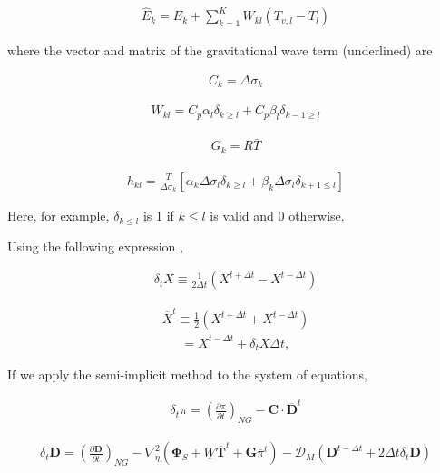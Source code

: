 \begin{eqnarray}
  \hat{E}_k = E_{k} 
            + \sum_{k=1}^{K} W_{kl} ( T_{v,l}-T_{l} )
\end{eqnarray}

where the vector and matrix of the gravitational wave term (underlined)
are

\begin{eqnarray}
  C_{k} = \Delta \sigma_{k}
\end{eqnarray}

\begin{eqnarray}
  W_{kl} = C_{p} \alpha_{l} \delta_{k \geq l}
         + C_{p} \beta_{l} \delta_{k-1 \geq l}
\end{eqnarray}

\begin{eqnarray}
  G_{k} = R\bar{T}
\end{eqnarray}

\begin{eqnarray}
h_{kl} = \frac{\bar{T}}{\Delta\sigma_k}\left[\alpha_k \Delta\sigma_l \delta_{k\ge l}+\beta_k \Delta\sigma_l \delta_{k+1\le l}\right]
\end{eqnarray}

Here, for example, \(\delta_{k \leq l}\) is 1 if \(k \leq l\) is valid
and 0 otherwise.

Using the following expression ,

\begin{eqnarray}
  \delta_{t} {X} \equiv \frac{1}{2 \Delta t} 
        \left( {X}^{t+\Delta t} - {X}^{t-\Delta t} \right)
\end{eqnarray}

\begin{eqnarray}
    \overline{X}^{t}
   \equiv  \frac{1}{2} \left( {X}^{t+\Delta t} 
                              + {X}^{t-\Delta t} \right)
\end{eqnarray} \begin{eqnarray}
   =  {X}^{t-\Delta t} + \delta_{t} {X} \Delta t   ,
\end{eqnarray}

If we apply the semi-implicit method to the system of equations,

\begin{eqnarray}
  \delta_{t} \pi =
          \left( \frac{\partial \pi}{\partial t} \right)_{NG}  
     - {\mathbf{C}} \cdot \overline{ {\mathbf{D}} }^{t}
\end{eqnarray}

\begin{eqnarray}
  \delta_{t} {\mathbf{D}} =
          \left( \frac{\partial {\mathbf{D}}}{\partial t} \right)_{NG}  
          - \nabla^{2}_{\eta} ( {\mathbf{\Phi}}_{S} 
                                  + \underline{W} 
                                     \overline{ {\mathbf{T}} }^{t}
                                  + {\mathbf{G}}
                                  \overline{\pi}^{t} ) 
          - {\mathcal D}_M ( {\mathbf{D}}^{t-\Delta t} 
                         + 2 \Delta t \delta_{t} {\mathbf{D}} )
\end{eqnarray}

